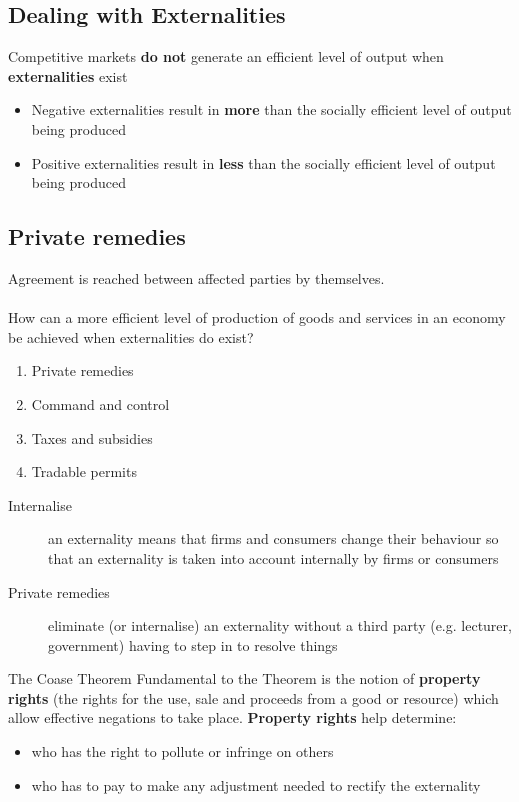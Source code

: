 \subsection{Dealing with Externalities}
Competitive markets \textbf{do not} generate an efficient level of output when \textbf{externalities} exist
\begin{itemize}
	\item Negative externalities result in \textbf{more} than the socially efficient level of output being produced
	\item Positive externalities result in \textbf{less} than the socially efficient level of output being produced
\end{itemize}

\subsection{Private remedies}
Agreement is reached between affected parties by themselves.\\\\
How can a more efficient level of production of goods and services in an economy be achieved when externalities do exist?
\begin{enumerate}
	\item Private remedies
	\item Command and control
	\item Taxes and subsidies
	\item Tradable permits
\end{enumerate}
\begin{description}
	\item[Internalise] an externality means that firms and consumers change their behaviour so that an externality is taken into account internally by firms or consumers
	\item[Private remedies] eliminate (or internalise) an externality without a third party (e.g. lecturer, government) having to step in to resolve things
\end{description}
\begin{note}{The Coase Theorem}
	Fundamental to the Theorem is the notion of \textbf{property rights} (the rights for the use, sale and proceeds from a good or resource) which allow effective negations to take place. \textbf{Property rights} help determine:
	\begin{itemize}
		\item who has the right to pollute or infringe on others
		\item who has to pay to make any adjustment needed to rectify the externality
	\end{itemize}
\end{note}

